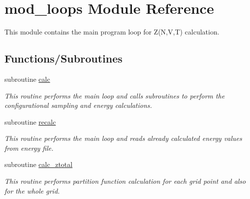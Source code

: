 \hypertarget{namespacemod__loops}{}\section{mod\+\_\+loops Module Reference}
\label{namespacemod__loops}


This module contains the main program loop for Z(\+N,\+V,\+T) calculation.  


\subsection*{Functions/\+Subroutines}
\begin{DoxyCompactItemize}
\item 
subroutine \hyperlink{namespacemod__loops_a6e4de9cf9c585c364502a63d328071bd}{calc}
\begin{DoxyCompactList}\small\item\em This routine performs the main loop and calls subroutines to perform the configurational sampling and energy calculations. \end{DoxyCompactList}\item 
subroutine \hyperlink{namespacemod__loops_a755c1c6e9232a99181d4ac9a7c0c5cff}{recalc}
\begin{DoxyCompactList}\small\item\em This routine performs the main loop and reads already calculated energy values from energy file. \end{DoxyCompactList}\item 
subroutine \hyperlink{namespacemod__loops_acfec0f16ef59b6277e9dfd13d5026965}{calc\+\_\+ztotal}
\begin{DoxyCompactList}\small\item\em This routine performs partition function calculation for each grid point and also for the whole grid. \end{DoxyCompactList}\end{DoxyCompactItemize}
